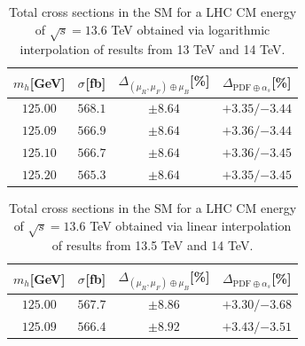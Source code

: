 \documentclass[11pt,a4paper]{article}
\begin{document}
\begin{table}[t]
\begin{center}%
\begin{small}%
\begin{tabular}{|c|c|c|c|}%
\hline
$m_h$[GeV] & $\sigma^{}$[fb] & $\Delta_{\left(\mu_{R},\mu_{F}\right)\oplus\mu_{B}}$[\%] & $\Delta_{\mathrm{PDF}\oplus\alpha_s}$[\%]  \\\hline\hline
$125.00$ & $568.1$ & $\pm8.64$ & ${{+3.35}}/{-3.44}$ \\\hline
$125.09$ & $566.9$ & $\pm8.64$ & ${{+3.36}}/{-3.44}$ \\\hline
$125.10$ & $566.7$ & $\pm8.64$ & ${{+3.36}}/{-3.45}$ \\\hline
$125.20$ & $565.3$ & $\pm8.64$ & ${{+3.35}}/{-3.45}$ \\\hline
\end{tabular}%
\end{small}%
\end{center}%
\caption{Total \bbH{} cross sections in the SM for a LHC CM energy of $\sqrt{s}=13.6$ TeV obtained via logarithmic interpolation of results from 13 TeV and 14 TeV.}
\label{tab:bbH136log}
\end{table}

\begin{table}[t]
\begin{center}%
\begin{small}%
\begin{tabular}{|c|c|c|c|}%
\hline
$m_h$[GeV] & $\sigma^{}$[fb] & $\Delta_{\left(\mu_{R},\mu_{F}\right)\oplus\mu_{B}}$[\%] & $\Delta_{\mathrm{PDF}\oplus\alpha_s}$[\%]  \\\hline\hline
$125.00$ & $567.7$ & $\pm8.86$ & ${{+3.30}}/{-3.68}$ \\\hline
$125.09$ & $566.4$ & $\pm8.92$ & ${{+3.43}}/{-3.51}$ \\\hline
\end{tabular}%
\end{small}%
\end{center}%
\caption{Total \bbH{} cross sections in the SM for a LHC CM energy of $\sqrt{s}=13.6$ TeV obtained via linear interpolation of results from 13.5 TeV and 14 TeV.}
\label{tab:bbH136linalt}
\end{table}
\end{document}
